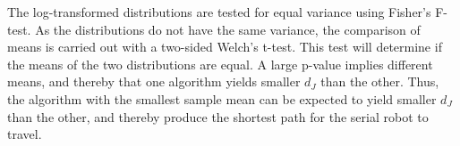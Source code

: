 The log-transformed distributions are tested for equal variance
using Fisher's F-test.
As the distributions do not have the same variance,
the comparison of means is carried out with a two-sided Welch's t-test.
This test will determine if the means of the two distributions are equal.
A large p-value implies different means, and thereby that one algorithm
yields smaller \(d_J\) than the other.
Thus, the algorithm with the smallest sample mean can be expected
to yield smaller \(d_J\) than the other, and thereby produce the shortest
path for the serial robot to travel.